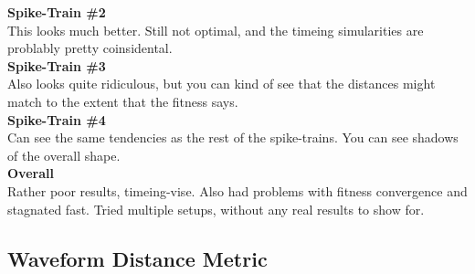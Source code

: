 \textbf{Spike-Train \#2} \\
This looks much better. Still not optimal, and the timeing simularities are problably pretty coinsidental. \\

\textbf{Spike-Train \#3} \\
Also looks quite ridiculous, but you can kind of see that the distances might match to the extent that the
fitness says.  \\

\textbf{Spike-Train \#4} \\
Can see the same tendencies as the rest of the spike-trains. You can see shadows of the overall shape.  \\

\textbf{Overall} \\
Rather poor results, timeing-vise. Also had problems with fitness convergence and stagnated fast. Tried multiple
setups, without any real results to show for. 






\subsection{Waveform Distance Metric}

